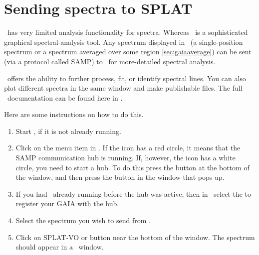 \documentclass[11pt,oneside,chapters]{starlink}
\providecommand{\splatsun}{\xref{\textbf{SUN/243}}{sun243}{}}
\begin{document}
\section{Sending spectra to SPLAT}
\label{sec:gaiatosplat}

\gaia\ has very limited analysis functionality for spectra.  Whereas
\splat\ is a sophisticated graphical spectral-analysis tool. Any
spectrum displayed in \gaia\ (a single-position spectrum or a spectrum
averaged over some region \ref{sec:gaiaaverage}) can be sent (via a
protocol called SAMP) to \splat\ for more-detailed spectral analysis.

\splat\ offers the ability to further process, fit, or identify
spectral lines.  You can also plot different spectra in the same
window and make publishable files.  The full \splat\ documentation can
be found here in \splatsun.

Here are some instructions on how to do this.

\begin{enumerate}[label=(\textbf{\arabic*})]

\item Start \splat, if it is not already running.

\begin{terminalv}
\end{terminalv}

\item Click on the  menu item in \splat.  If the
 icon has a red circle, it means that the SAMP
communication hub is running.  If, however, the icon has a white
circle, you need to start a hub.  To do this press the
 button at the bottom of the window, and
then press the  button in the window that
pops up.

\item If you had \gaia\ already running before the hub was active, then in
\gaia\ select the  to register your GAIA with
the hub.

\item Select the spectrum you wish to send from \gaia.

\item Click on SPLAT-VO  or 
button near the bottom of the 
window.  The spectrum should appear in a \splat\ window.

\end{enumerate}
\end{document}
